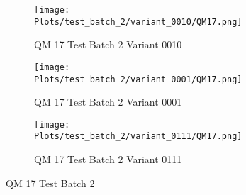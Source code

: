 \documentclass{DissertateFigs}
\begin{document}
\begin{figure}[t!]
\medskip

    \begin{subfigure}{0.43\textwidth}
    \texttt{[image: Plots/test\_batch\_2/variant\_0010/QM17.png]}
    \caption{QM 17 Test Batch 2 Variant 0010}
    \end{subfigure}
    \begin{subfigure}{0.43\textwidth}
    \texttt{[image: Plots/test\_batch\_2/variant\_0001/QM17.png]}
    \caption{QM 17 Test Batch 2 Variant 0001}
    \end{subfigure}

\medskip

    \begin{subfigure}{0.43\textwidth}
    \texttt{[image: Plots/test\_batch\_2/variant\_0111/QM17.png]}
    \caption{QM 17 Test Batch 2 Variant 0111}
    \end{subfigure}
\caption{QM 17 Test Batch 2}
    \end{figure}
\clearpage
\end{document}
